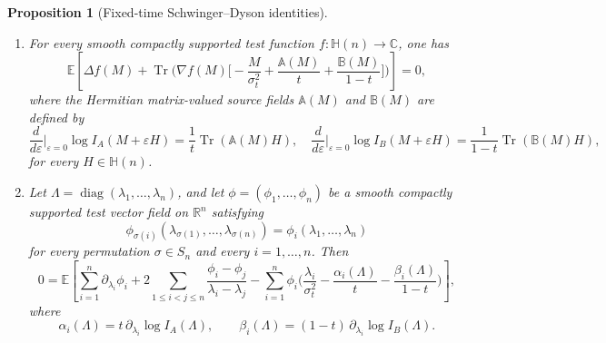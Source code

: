 \documentclass[11pt,a4paper]{article}
\newtheorem{proposition}[theorem]{Proposition}
\theoremstyle{definition}\newtheorem{definition}[theorem]{Definition}
\theoremstyle{remark}\newtheorem{remark}[theorem]{Remark}
\numberwithin{equation}{section}
\DeclareMathOperator{\Tr}{Tr}
\DeclareMathOperator{\diag}{diag}
\newcommand{\R}{\mathbb{R}}
\newcommand{\C}{\mathbb{C}}
\newcommand{\HH}{\mathbb{H}(n)}
\newcommand{\EE}{\mathbb{E}}
\begin{document}
\begin{proposition}[Fixed-time Schwinger--Dyson identities]
\label{prop:master_SD}
\leavevmode
\begin{enumerate}
\item[\textup{(i)}] For every smooth compactly supported test function
$f:\HH\to\C$, one has
\begin{equation}\label{eq:master_SD_physical}
\EE\!\left[
\Delta f(M)
+
\Tr\!\Big(
\nabla f(M)
\Big[
-\frac{M}{\sigma_t^2}
+\frac{\mathbb A(M)}{t}
+\frac{\mathbb B(M)}{1-t}
\Big]
\Big)
\right]
=0,
\end{equation}
where the Hermitian matrix-valued source fields $\mathbb A(M)$ and
$\mathbb B(M)$ are defined by
\begin{equation}\label{eq:source_fields_defs_SD}
\frac{d}{d\varepsilon}\Big|_{\varepsilon=0}\log I_A(M+\varepsilon H)
=
\frac1t\Tr(\mathbb A(M)H),
\quad
\frac{d}{d\varepsilon}\Big|_{\varepsilon=0}\log I_B(M+\varepsilon H)
=
\frac1{1-t}\Tr(\mathbb B(M)H),
\end{equation}
for every $H\in\HH$.

\item[\textup{(ii)}] Let $\Lambda=\diag(\lambda_1,\dots,\lambda_n)$, and let
$\phi=(\phi_1,\dots,\phi_n)$ be a smooth compactly supported test vector field on
$\R^n$ satisfying
\begin{equation}
\phi_{\sigma(i)}(\lambda_{\sigma(1)},\dots,\lambda_{\sigma(n)})
=
\phi_i(\lambda_1,\dots,\lambda_n)
\end{equation}
for every permutation $\sigma\in S_n$ and every $i=1,\dots,n$. Then
\begin{equation}\label{eq:eigenvalue_SD_physical}
0=
\EE\!\left[
\sum_{i=1}^n \partial_{\lambda_i}\phi_i
+
2\sum_{1\le i<j\le n}\frac{\phi_i-\phi_j}{\lambda_i-\lambda_j}
-
\sum_{i=1}^n
\phi_i
\Big(
\frac{\lambda_i}{\sigma_t^2}
-\frac{\alpha_i(\Lambda)}{t}
-\frac{\beta_i(\Lambda)}{1-t}
\Big)
\right],
\end{equation}
where
\begin{equation} 
\alpha_i(\Lambda)=t\,\partial_{\lambda_i}\log I_A(\Lambda),
\qquad
\beta_i(\Lambda)=(1-t)\,\partial_{\lambda_i}\log I_B(\Lambda).
\end{equation}
\end{enumerate}
\end{proposition}
\end{document}
